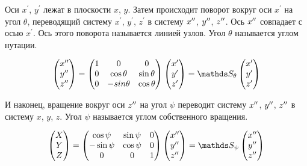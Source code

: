 Оси  $x^\prime$, $y^\prime$ лежат в плоскости $x$, $y$. Затем происходит поворот вокруг оси $x^\prime$ на угол $\theta$, переводящий систему $x^\prime$, $y^\prime$, $z^\prime$ в систему $x^{\prime \prime}$, $y^{\prime \prime}$, $z^{\prime \prime}$. Ось $x^{\prime \prime}$ совпадает с осью $x^{\prime}$. Ось этого поворота называется линией узлов. Угол $\theta$ называется углом нутации.

\begin{gather}
\begin{pmatrix}
x^{\dpr} \\
y^{\dpr} \\
z^{\dpr} 
\end{pmatrix} = 
\begin{pmatrix}
1 & 0 & 0 \\
0 & \cos \theta & \sin \theta \\
0 & - sin \theta & \cos \theta
\end{pmatrix}
\begin{pmatrix}
x^\prime \\
y^\prime \\
z^\prime
\end{pmatrix} = 
\bbS_\theta
\begin{pmatrix}
x^\prime \\
y^\prime \\
z^\prime
\end{pmatrix} \notag
\end{gather}   

И наконец, вращение вокруг оси $z^{\prime \prime}$ на угол $\psi$ переводит систему $x^{\prime \prime}$, $y^{\prime \prime}$, $z^{\prime \prime}$ в систему $x$, $y$, $z$. Угол $\psi$ называется углом собственного вращения.

\begin{gather}
\begin{pmatrix}
X \\
Y \\
Z
\end{pmatrix} =
\begin{pmatrix}
\cos \psi & \sin \psi & 0 \\
- \sin \psi & \cos \psi & 0 \\
0 & 0 & 1
\end{pmatrix}
\begin{pmatrix}
x^{\dpr} \\
y^{\dpr} \\
z^{\dpr}
\end{pmatrix} = 
\bbS_\psi 
\begin{pmatrix}
x^{\dpr} \\
y^{\dpr} \\
z^{\dpr}
\end{pmatrix} \notag
\end{gather}

